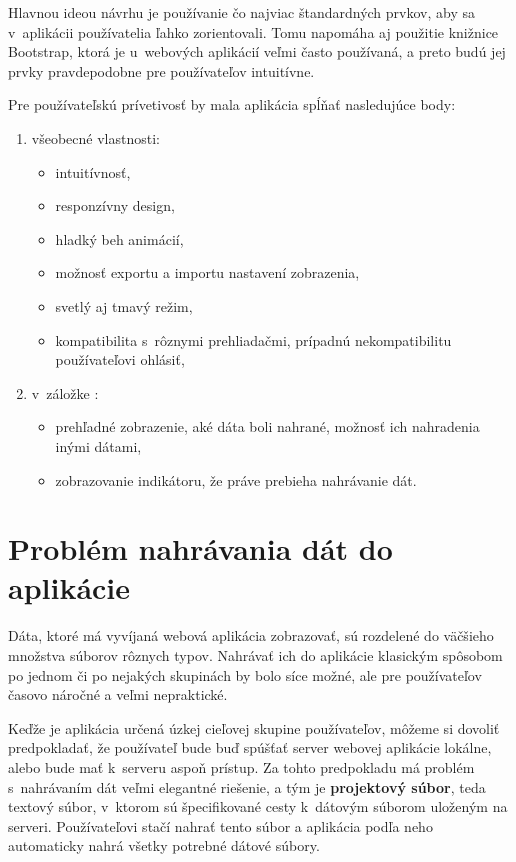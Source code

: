 Hlavnou ideou návrhu je používanie čo najviac štandardných prvkov, aby sa v~aplikácii používatelia ľahko zorientovali. Tomu napomáha aj použitie knižnice Bootstrap, ktorá je u~webových aplikácií veľmi často používaná, a preto budú jej prvky pravdepodobne pre používateľov intuitívne.

Pre používateľskú prívetivosť by mala aplikácia spĺňať nasledujúce body:

\begin{enumerate}
    \item všeobecné vlastnosti:
    \begin{itemize}
        \item intuitívnosť,
        \item responzívny design,
        \item hladký beh animácií,
        \item možnosť exportu a importu nastavení zobrazenia,
        \item svetlý aj tmavý režim,
        \item kompatibilita s~rôznymi prehliadačmi, prípadnú nekompatibilitu používateľovi ohlásiť,
    \end{itemize}
    \item v~záložke :
    \begin{itemize}
        \item prehľadné zobrazenie, aké dáta boli nahrané, možnosť ich nahradenia inými dátami,
        \item zobrazovanie indikátoru, že práve prebieha nahrávanie dát.
    \end{itemize}
\end{enumerate}

\section{Problém nahrávania dát do aplikácie}

Dáta, ktoré má vyvíjaná webová aplikácia zobrazovať, sú rozdelené do väčšieho množstva súborov rôznych typov. Nahrávať ich do aplikácie klasickým spôsobom po jednom či po nejakých skupinách by bolo síce možné, ale pre používateľov časovo náročné a veľmi nepraktické.

Keďže je aplikácia určená úzkej cieľovej skupine používateľov, môžeme si dovoliť predpokladať, že používateľ bude buď spúšťať server webovej aplikácie lokálne, alebo bude mať k~serveru aspoň prístup. Za tohto predpokladu má problém s~nahrávaním dát veľmi elegantné riešenie, a tým je \textbf{projektový súbor}, teda textový súbor, v~ktorom sú špecifikované cesty k~dátovým súborom uloženým na serveri. Používateľovi stačí nahrať tento súbor a aplikácia podľa neho automaticky nahrá všetky potrebné dátové súbory.

